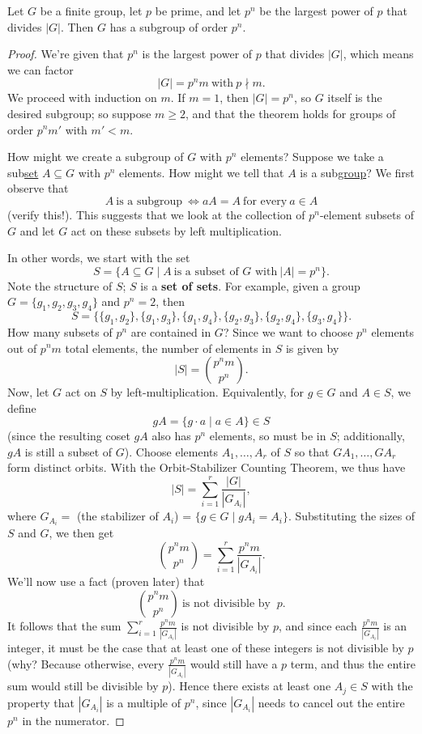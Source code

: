 \documentclass[math1530-lecture-notes]{subfiles}
\begin{document}
\begin{theorem}{}
  Let $G$ be a finite group, let $p$ be prime, and let $p^n$ be the largest power of $p$ that
  divides $\left| G \right| $. Then $G$ has a subgroup of order $p^n$.
\end{theorem}
\begin{proof}[Proof]
  We're given that $p^n$ is the largest power of $p$ that divides $\left| G \right| $, which means
  we can factor \[
    \left| G \right| =p^nm ~\text{with}~p\nmid m
  .\] We proceed with induction on $m$. If $m=1$, then $\left| G \right| =p^n$, so $G$ itself is the
  desired subgroup; so suppose $m\ge 2$, and that the theorem holds for groups of order $p^nm'$ with
  $m'<m$.

  How might we create a subgroup of $G$ with $p^n$ elements? Suppose we take a sub\underline{set}
  $A\subseteq G$ with $p^n$ elements. How might we tell that $A$ is a sub\underline{group}? We first
  observe that \[
    A~\text{is a subgroup}~\iff aA=A~\text{for every}~a\in A
  \] (verify this!). This suggests that we look at the collection of $p^n$-element subsets of $G$
  and let $G$ act on these subsets by left multiplication.

  In other words, we start with the set \[
    S=\{A\subseteq G\mid A~\text{is a subset of $G$ with}~\left| A \right| =p^n\} 
  .\] Note the structure of $S$; $S$ is a \textbf{set of sets}. For example, given a group $G=\{
  g_1,g_2,g_3,g_4 \}$ and $p^n=2$, then \[
    S=\{ \{ g_1,g_2 \}, \{ g_1,g_3 \}, \{ g_1,g_4 \}, \{ g_2,g_3 \}, \{ g_2,g_4 \}, \{ g_3,g_4 \} \}
  .\] How many subsets of $p^n$ are contained in $G$? Since we want to choose $p^n$ elements out of
  $p^nm$ total elements, the number of elements in $S$ is given by \[
    \left| S \right| =\binom{p^nm}{p^n}
  .\] Now, let $G$ act on $S$ by left-multiplication. Equivalently, for $g\in G$ and $A\in S$, we
  define \[
    gA=\{g\cdot a\mid a\in A\} \in S
  \] (since the resulting coset $gA$ also has $p^n$ elements, so must be in $S$; additionally, $gA$
  is still a subset of $G$). Choose elements $A_1,\ldots,A_r$ of $S$ so that $GA_1,\ldots,GA_r$ form
  distinct orbits. With the Orbit-Stabilizer Counting Theorem, we thus have \[
    \left| S \right| =\sum_{i=1}^{r} \frac{\left| G \right| }{\left| G_{A_i} \right| }
  ,\] where $G_{A_i}=$ (the stabilizer of $A_i$) = $\{g\in G\mid gA_i=A_i\} $. Substituting the
  sizes of $S$ and $G$, we then get \[
    \binom{p^nm}{p^n}=\sum_{i=1}^{r} \frac{p^nm}{\left| G_{A_i} \right| }
  .\] We'll now use a fact (proven later) that \[
    \binom{p^nm}{p^n}~\text{is not divisible by }~p
  .\] It follows that the sum $\sum_{i=1}^{r} \frac{p^nm}{\left| G_{A_i} \right| }$ is not divisible
  by $p$, and since each $\frac{p^nm}{\left| G_{A_i} \right| }$ is an integer, it must be the case
  that at least one of these integers is not divisible by $p$ (why? Because otherwise, every
  $\frac{p^nm}{\left| G_{A_i} \right| }$ would still have a $p$ term, and thus the entire sum would
  still be divisible by $p$). Hence there exists at least one $A_j\in S$ with the property that
  $\left| G_{A_i} \right| $ is a multiple of $p^n$, since $\left| G_{A_i} \right| $ needs to cancel
  out the entire $p^n$ in the numerator.


\end{proof}
\end{document}
